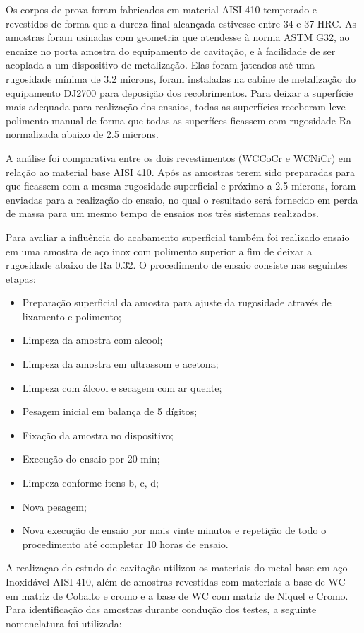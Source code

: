 Os corpos de prova foram fabricados em material AISI 410 temperado e revestidos
de forma que a dureza final alcançada estivesse entre 34 e 37 HRC. As amostras
foram usinadas com geometria que atendesse à norma ASTM G32, ao encaixe no porta
amostra do equipamento de cavitação, e à facilidade de ser acoplada a um
dispositivo de metalização. Elas foram jateados até uma rugosidade mínima de 3.2
microns, foram instaladas na cabine de metalização do equipamento DJ2700 para
deposição dos recobrimentos. Para deixar a superfície mais adequada para
realização dos ensaios, todas as superfícies receberam leve polimento manual de
forma que todas as superfíces ficassem com rugosidade Ra normalizada abaixo de
2.5 microns.

A análise foi comparativa entre os dois revestimentos (WCCoCr e WCNiCr) em
relação ao material base AISI 410. Após as amostras terem sido preparadas  para
que ficassem com a mesma rugosidade superficial e próximo a 2.5 microns, foram
enviadas para a realização do ensaio, no qual o resultado será fornecido em
perda de massa para um mesmo tempo de ensaios nos três sistemas realizados.

Para avaliar a influência do acabamento superficial também foi realizado ensaio
em uma amostra de aço inox com polimento superior a fim de deixar a rugosidade
abaixo de Ra 0.32. O procedimento de ensaio consiste nas seguintes etapas:
\begin{itemize}
	\item Preparação superficial da amostra para ajuste da rugosidade através de
lixamento e polimento;
	\item Limpeza da amostra com alcool;
	\item Limpeza da amostra em ultrassom e acetona;
	\item Limpeza com álcool e secagem com ar quente;
	\item Pesagem inicial em balança de 5 dígitos;
	\item Fixação da amostra no dispositivo;
	\item Execução do ensaio por 20 min;
	\item Limpeza conforme itens b, c, d;
	\item Nova pesagem;
	\item Nova execução de ensaio por mais vinte minutos e repetição de todo o
procedimento até completar 10 horas de ensaio.
\end{itemize}

A realizaçao do estudo de cavitação utilizou os materiais do metal
base em aço Inoxidável AISI 410, além de amostras revestidas com materiais a
base de WC em matriz de Cobalto e cromo e a base de WC com matriz de Niquel e
Cromo. Para identificação das amostras durante condução dos testes, a seguinte
nomenclatura foi utilizada:

